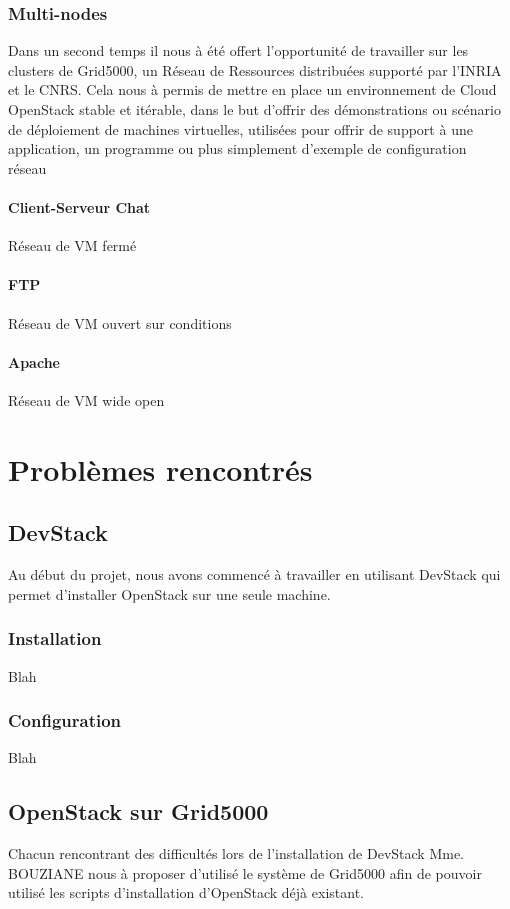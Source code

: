 \documentclass{report}
\begin{document}
        \subsection{Multi-nodes}
            Dans un second temps il nous à été offert l'opportunité de travailler sur les clusters
            de Grid5000, un Réseau de Ressources distribuées supporté par l'INRIA et le CNRS.\break
            Cela nous à permis de mettre en place un environnement de Cloud OpenStack stable et itérable, 
						dans le but d'offrir des démonstrations ou scénario de déploiement de machines virtuelles,
						utilisées pour offrir de support à une application, un programme ou plus simplement d'exemple de 
						configuration réseau~ 
					\subsubsection{Client-Serveur Chat}
						Réseau de VM fermé
					\subsubsection{FTP}
						Réseau de VM ouvert sur conditions
					\subsubsection{Apache}
						Réseau de VM wide open

\chapter{Problèmes rencontrés}
    \section{DevStack}
        Au début du projet, nous avons commencé à travailler en utilisant DevStack qui permet d'installer OpenStack sur une seule machine.
        \subsection{Installation}
            Blah
        \subsection{Configuration}
            Blah
    \section{OpenStack sur Grid5000}
        Chacun rencontrant des difficultés lors de l'installation de DevStack Mme. BOUZIANE nous à proposer d'utilisé le système de Grid5000 afin de pouvoir utilisé les scripts d'installation d'OpenStack déjà existant.
\end{document}
